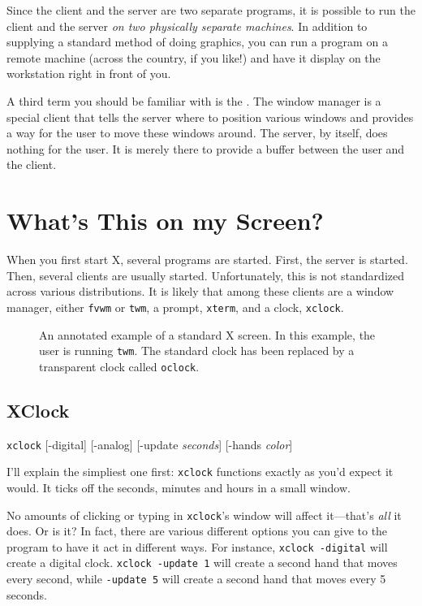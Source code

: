 Since the client and the server are two separate programs, it is
possible to run the client and the server {\em on two physically
  separate machines\/}.  In addition to supplying a standard method of
doing graphics, you can run a program on a remote machine (across the
country, if you like!) and have it display on the workstation right in
front of you.

A third term you should be familiar with is the
. The window manager is a special client that
tells the server where to position various windows and provides a way
for the user to move these windows around. The server, by itself, does
nothing for the user. It is merely there to provide a buffer between
the user and the client.

\section{What's This on my Screen?}

When you first start X, several programs are started. First, the
server is started. Then, several clients are usually
started. Unfortunately, this is not standardized across various
distributions. It is likely that among these clients are a window
manager, either {\tt fvwm} or {\tt twm}, a prompt, {\tt xterm}, and a
clock, {\tt xclock}.

\begin{figure}[tbf]\label{full-x-screen}
\centering
{}
\caption{An annotated example of a standard X screen.  In this
 example, the user is running {\tt twm}.  The standard clock has been
  replaced by a transparent clock called {\tt oclock}.}
\end{figure}

\subsection{XClock}

\begin{command}
{\tt xclock} [-digital] [-analog] [-update {\sl seconds}] [-hands {\sl
  color}]
\end{command}

I'll explain the simpliest one first: {\tt xclock}
functions exactly as you'd expect it would.  It ticks off the seconds,
minutes and hours in a small window.

No amounts of clicking or typing in {\tt xclock}'s window will affect
it---that's {\em all\/} it does. Or is it? In fact, there are various
different options you can give to the program to have it act in
different ways. For instance, {\tt xclock -digital} will create a
digital clock. {\tt xclock -update 1} will create a second hand that
moves every second, while {\tt -update 5} will create a second hand
that moves every 5 seconds.

